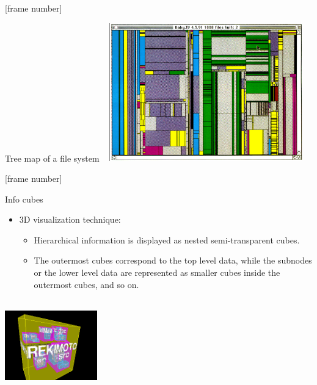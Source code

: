 \documentclass[aspectratio=169,t]{beamer}
\begin{document}
  {
    [frame number]
    \begin{frame}{Tree map of a file system}
    \centering
    \vspace{0.5cm}
    \includegraphics[width=9cm, height=6cm]{img/treemap_filesystem.png}
    \end{frame}
  }

  {
    [frame number]
    \begin{frame}{Info cubes}
    \begin{itemize}
      \item $3$D visualization technique:
      \begin{itemize}
        \item Hierarchical information is displayed as nested semi-transparent cubes.
        \item The outermost cubes correspond to the top level data, while the subnodes or the lower level data are represented as smaller cubes inside the outermost cubes, and so on.
      \end{itemize}
    \end{itemize}
    \vspace{0.2cm}
    \centering
    \includegraphics[width=4cm,height=4cm]{img/infocube.png}
    \end{frame}
  }
\end{document}
